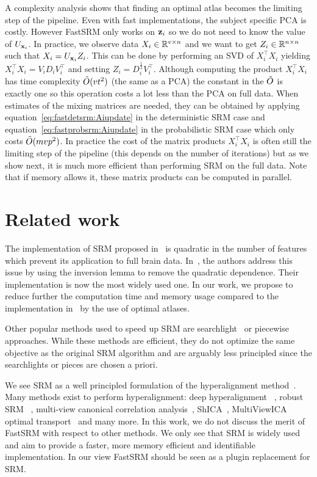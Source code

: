 \documentclass{article}
\begin{document}
A complexity analysis shows that finding an optimal atlas becomes the limiting
step of the pipeline.
%
Even with fast implementations, the subject specific PCA
is costly.
%
However FastSRM only works on $\mathbf{z}_i$ so we do not need to know the value of
$U_{\mathbf{x}_i}$.
%
In practice, we observe data $X_i \in \mathbb{R}^{v \times n}$ and we want to get $Z_i
\in \mathbb{R}^{n \times n}$ such that $X_i = U_{\mathbf{x}_i} Z_i$.
%
This can be done by performing an
SVD of $X_i^{\top} X_i$ yielding $X_i^{\top}X_i= V_i D_i V_i^{\top}$ and setting
$Z_i = D_i^{\frac12} V_i^{\top}$.
%
Although computing the product $X_i^{\top} X_i$ has time complexity
$\tilde{O}(vt^2)$ (the same as a PCA) the constant in the $\tilde{O}$ is exactly one so
this operation costs a lot less than the PCA
on full data.
%
When estimates of the mixing matrices are needed, they can be obtained by
applying equation~\eqref{eq:fastdetsrm:Aiupdate} in the deterministic SRM case and
equation~\eqref{eq:fastprobsrm:Aiupdate} in the probabilistic SRM case which only costs
$\tilde{O}(mvp^2)$.
%
In practice the cost of the matrix products $X_i^{\top} X_i$ is often still the
limiting step of the pipeline (this depends on the number of iterations) but as
we show next, it is much more efficient than performing SRM on
the full data.
%
Note that if memory allows it, these matrix products can be
computed in parallel.
%

\section{Related work}
The implementation of SRM proposed in~\cite{chen2015reduced} is quadratic in the
number of features which prevent its application to full brain data.
In~\cite{anderson2016enabling}, the authors address this issue by using the
inversion lemma to remove the quadratic dependence. Their implementation is now the most widely used one.
In our work, we propose to reduce further the computation time and memory usage
compared to the implementation in~\cite{anderson2016enabling} by the use of
optimal atlases.

Other popular methods used to speed up SRM are searchlight~\cite{zhang2016searchlight} or piecewise~\cite{bazeille2021empirical}
approaches. While these methods are efficient, they do not optimize the same
objective as the original SRM algorithm and are arguably less principled since the
searchlights or pieces are chosen a priori.

We see SRM as a well principled formulation of the hyperalignment
method~\cite{haxby2011common}.
%
Many methods exist to perform hyperalignment: deep
hyperalignment~\cite{yousefnezhad2017deep} , robust
SRM~\cite{turek2018capturing} , multi-view canonical correlation
analysis~\cite{li2009joint}, ShICA~\cite{richard2021model},
MultiViewICA~\cite{richard2020modeling} optimal
transport~\cite{bazeille2019local} and many more.
%
In this work, we do not discuss the merit of FastSRM with respect to
other methods. We only see that SRM is widely used and aim to provide
a faster, more memory efficient and identifiable implementation.  In
our view FastSRM should be seen as a plugin replacement for SRM.
\end{document}
